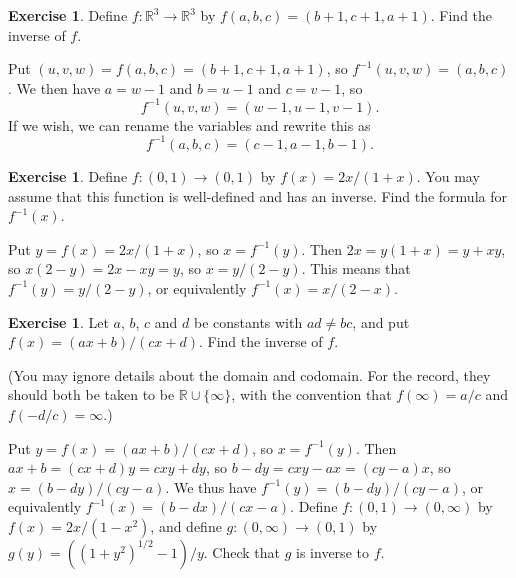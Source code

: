\documentclass[a4paper]{book}
\newcommand{\R}         {{\mathbb{R}}}
\newcommand{\xra}       {\xrightarrow}
\renewcommand{\:}{\colon}
\theoremstyle{definition}
\newtheorem{exercise}[theorem]{Exercise}
\newenvironment{starex}{
 \renewcommand{\thetheorem}{\arabic{chapter}.\arabic{section}.\arabic{theorem}${}^*$}
 \exercise
}{\endexercise}
\renewenvironment{solution}{\SolutionInline}{\endSolutionInline}
\begin{document}
\begin{exercise}
 Define $f\:\R^3\xra{}\R^3$ by $f(a,b,c)=(b+1,c+1,a+1)$.  Find the
 inverse of $f$.  
\end{exercise}
\begin{solution}
 Put $(u,v,w)=f(a,b,c)=(b+1,c+1,a+1)$, so $f^{-1}(u,v,w)=(a,b,c)$.  We
 then have $a=w-1$ and $b=u-1$ and $c=v-1$, so 
 \[ f^{-1}(u,v,w) = (w-1,u-1,v-1). \]
 If we wish, we can rename the variables and rewrite this as
 \[ f^{-1}(a,b,c) = (c-1,a-1,b-1). \]
\end{solution}


\begin{exercise}
 Define $f\:(0,1)\xra{}(0,1)$ by $f(x)=2x/(1+x)$.  You may assume that
 this function is well-defined and has an inverse.  Find the formula
 for $f^{-1}(x)$.
\end{exercise}
\begin{solution}
 Put $y=f(x)=2x/(1+x)$, so $x=f^{-1}(y)$.  Then $2x=y(1+x)=y+xy$, so
 $x(2-y)=2x-xy=y$, so $x=y/(2-y)$.  This means that
 $f^{-1}(y)=y/(2-y)$, or equivalently $f^{-1}(x)=x/(2-x)$.
\end{solution}
\begin{exercise}
 Let $a$, $b$, $c$ and $d$ be constants with $ad\neq bc$, and put
 $f(x)=(ax+b)/(cx+d)$.  Find the inverse of $f$.

 (You may ignore details about the domain and codomain.  For the
 record, they should both be taken to be $\R\cup\{\infty\}$, with the
 convention that $f(\infty)=a/c$ and $f(-d/c)=\infty$.)
\end{exercise}
\begin{solution}
 Put $y=f(x)=(ax+b)/(cx+d)$, so $x=f^{-1}(y)$.  Then
 $ax+b=(cx+d)y=cxy+dy$, so $b-dy=cxy-ax=(cy-a)x$, so
 $x=(b-dy)/(cy-a)$.  We thus have $f^{-1}(y)=(b-dy)/(cy-a)$, or
 equivalently $f^{-1}(x)=(b-dx)/(cx-a)$.
\end{solution}
\begin{starex}
 Define $f\:(0,1)\xra{}(0,\infty)$ by $f(x)=2x/(1-x^2)$, and define
 $g\:(0,\infty)\xra{}(0,1)$ by $g(y)=((1+y^2)^{1/2}-1)/y$.  Check that
 $g$ is inverse to $f$.
\end{starex}
\end{document}
